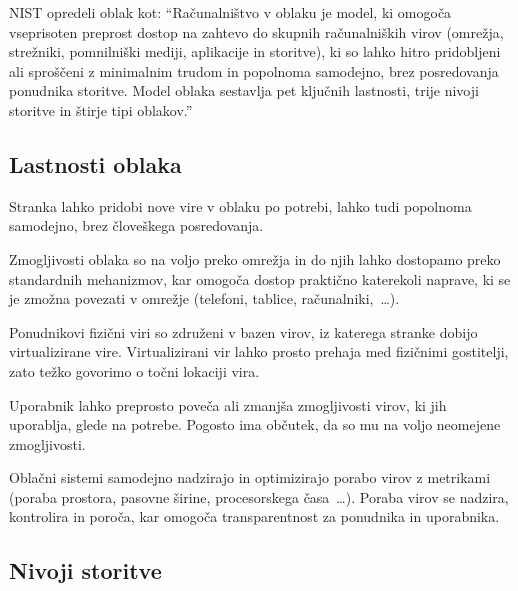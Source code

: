 \documentclass[12pt,a4paper,openany,tikz]{book}
\theoremstyle{plain}
\theoremstyle{definition}
\begin{document}
\gls{NIST} opredeli oblak kot: ``Računalništvo v oblaku je model, ki omogoča vseprisoten preprost dostop na zahtevo do skupnih računalniških virov (omrežja, strežniki, pomnilniški mediji, aplikacije in storitve), ki so lahko hitro pridobljeni ali sproščeni z minimalnim trudom in popolnoma samodejno, brez posredovanja ponudnika storitve. Model oblaka sestavlja pet ključnih lastnosti, trije nivoji storitve in štirje tipi oblakov.''~\cite{mell2011nist}

\subsection*{Lastnosti oblaka}
\label{sub:Lastnosti oblaka}

\begin{description}[style=nextline]
   \item[Storitev na zahtevo] Stranka lahko pridobi nove vire v oblaku po potrebi, lahko tudi popolnoma samodejno, brez človeškega posredovanja.

   \item[Širok dostop preko omrežja] Zmogljivosti oblaka so na voljo preko omrežja in do njih lahko dostopamo preko standardnih mehanizmov, kar omogoča dostop praktično katerekoli naprave, ki se je zmožna povezati v omrežje (telefoni, tablice, računalniki,~\ldots).

   \item[Uporaba skupnih virov] Ponudnikovi fizični viri so združeni v bazen virov, iz katerega stranke dobijo virtualizirane vire. Virtualizirani vir lahko prosto prehaja med fizičnimi gostitelji, zato težko govorimo o točni lokaciji vira.

   \item[Bliskovita prožnost] Uporabnik lahko preprosto poveča ali zmanjša zmogljivosti virov, ki jih uporablja, glede na potrebe. Pogosto ima občutek, da so mu na voljo neomejene zmogljivosti.

   \item[Merjenje porabe in obračun glede na porabo virov]  Oblačni sistemi samodejno nadzirajo in optimizirajo porabo virov z metrikami (poraba prostora, pasovne širine, procesorskega časa~\ldots). Poraba virov se nadzira, kontrolira in poroča, kar omogoča transparentnost za ponudnika in uporabnika.
\end{description}

\subsection*{Nivoji storitve}
\label{sub:Nivoji storitve}
\end{document}
